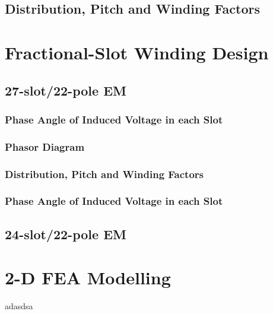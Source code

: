\documentclass[a4paper, 11pt]{article}
\begin{document}
\subsection{Distribution, Pitch and Winding Factors}

\section{Fractional-Slot Winding Design}
\subsection{27-slot/22-pole EM}
\subsubsection{Phase Angle of Induced Voltage in each Slot}
\subsubsection{Phasor Diagram}
\subsubsection{Distribution, Pitch and Winding Factors}
\subsubsection{Phase Angle of Induced Voltage in each Slot}
\subsection{24-slot/22-pole EM}

\section{2-D FEA Modelling}

adasdsa\cite{hanselman}

\newpage

 

\end{document}
